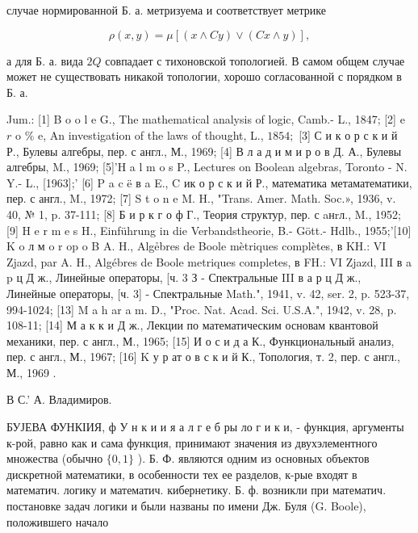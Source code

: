 \documentclass[10pt]{article}
\begin{document}
случае нормированной Б. а. метризуема и соответствует метрике



\[

\rho(x, y)=\mu[(x \wedge C y) \vee(C x \wedge y)],

\]



а для Б. а. вида $2 Q$ совпадает с тихоновской топологией. В самом общем случае может не существовать никакой топологии, хорошо согласованной с порядком в Б. а.



Jum.: [1] B o o l e G., The mathematical analysis of logic, Camb.- L., 1847; [2] e $r$ o $\%$ e, An investigation of the laws of thought, L., $1854 ;$ [3] С и к о р с к и й Р., Булевы алгебры, пер. с англ., М., 1969; [4] В л а д и м и р о в Д. А., Булевы алгебры, M., 1969; [5]'H a l m o s P., Lectures on Boolean algebras, Toronto - N. Y.- L., [1963];' [6] P a c ë в a E., C ик о р с к и й Р., математика метаматематики, пер. с англ., M., 1972; [7] S t o n e M. H., "Trans. Amer. Math. Soc.», 1936, v. 40, № 1, p. 37-111; [8] Б и р к г о ф Г., Теория структур, пер. с aнrл., M., 1952; [9] H e r m e s H., Einführung in die Verbandstheorie, B.- Gött.- Hdlb., 1955;'[10] K o л м o r op o B A. H., Algẻbres de Boole mètriques complètes, в KH.: VI Zjazd, par A. H., Algébres de Boole metriques completes, в FH.: VI Zjazd, III в a p ц Д ж., Линейные операторы, [ч. 3 З - Спектральные III в а р ц Д ж., Линейные операторы, [ч. 3] - Спектральные Math.", 1941, v. 42, ser. 2, p. 523-37, 994-1024; [13] M a h ar a m. D., "Proc. Nat. Acad. Sci. U.S.A.", 1942, v. 28, p. 108-11; [14] М а к к и Д ж., Лекции по математическим основам квантовой механики, пер. с англ., М., 1965; [15] И о с и д а К., Функциональный анализ, пер. с англ., М., 1967; [16] K у р ат о в с к и й К., Топология, т. 2, пер. с англ., М., 1969 .



В С.' А. Владимиров.



БУЈЕВА ФУНКІИЯ, ф У н к и и я а л г е б ры ло г и к и, - функция, аргументы к-рой, равно как и сама функция, принимают значения из двухэлементного множества (обычно $\{0,1\}$ ). Б. Ф. являются одним из основных объектов дискретной математики, в особенности тех ее разделов, к-рые входят в математич. логику и математич. кибернетику. Б. ф. возникли при математич. постановке задач логики и были названы по имени Дж. Буля (G. Boole), положившего начало
\end{document}
